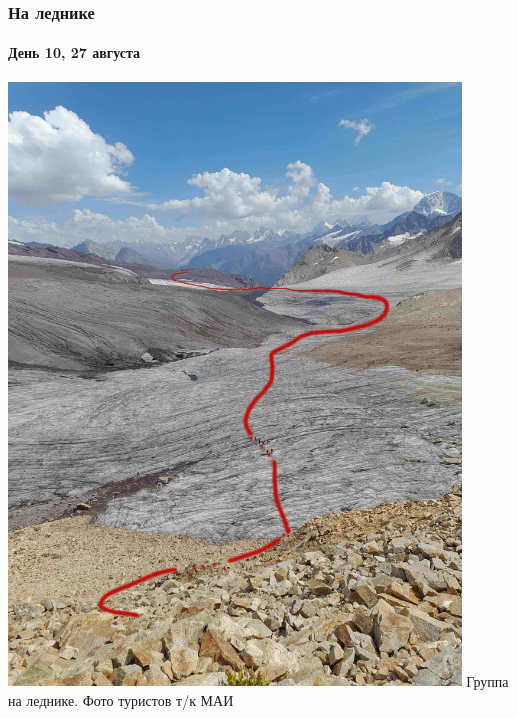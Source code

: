 \begin{frame}
	\frametitle{На леднике}
	\framesubtitle{День 10, 27 августа}
	{\scriptsize
		\begin{minipage}{\fourpicsize}
			\centering
			\includegraphics[width=0.9\textwidth]{../pics/20240830_141852.jpg}			
			Группа на леднике. Фото туристов т/к МАИ
		\end{minipage}
		\hfill
		\begin{minipage}{\fourpicsize}
			\centering

\end{minipage}}
\end{frame}
